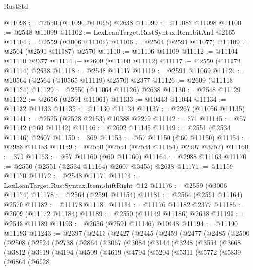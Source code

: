 \begin{lexlean}{RustStd}
\begin{coremodule}
@11098 := @2550 (@11090 @11095) @2638
@11099 := @11082 @11098
@11100 := @2548 @11099
@11102 := LexLeanTarget.RustSyntax.Item.bitAnd @2165
@11104 := @2559 (@3006 @11102)
@11106 := @2564 (@2591 @11077)
@11109 := @2564 (@2591 @11087) @2570
@11110 := @11106 @11109
@11112 := @11104 @11110 @2377
@11114 := @2609 (@11100 @11112)
@11117 := @2550 (@11072 @11114) @2638
@11118 := @2548 @11117
@11119 := @2591 @11069
@11124 := @10564 (@2564 (@10565 @11119) @2570) @2377
@11126 := @2609 (@11118 @11124)
@11129 := @2550 (@11064 @11126) @2638
@11130 := @2548 @11129
@11132 := @2656 (@2591 @11061)
@11133 := @10443 @11044
@11134 := @11132 @11133
@11135 := @11130 @11134
@11137 := @2267 (@11056 @11135)
@11141 := @2525 (@2528 @2153) @10388 @2279
@11142 := 371
@11145 := @57 @11142 (@60 @11142)
@11146 := @2602 @11145
@11149 := @2551 (@2534 @11146) @2607
@11150 := 369
@11153 := @57 @11150 (@60 @11150)
@11154 := @2988 @11153
@11159 := @2550 (@2551 (@2534 @11154) @2607 @3752)
@11160 := 370
@11163 := @57 @11160 (@60 @11160)
@11164 := @2988 @11163
@11170 := @2550 (@2551 (@2534 @11164) @2607 @3455) @2638
@11171 := @11159 @11170
@11172 := @2548 @11171
@11174 := LexLeanTarget.RustSyntax.Item.shiftRight @12
@11176 := @2559 (@3006 @11174)
@11178 := @2564 (@2591 @11154)
@11181 := @2564 (@2591 @11164) @2570
@11182 := @11178 @11181
@11184 := @11176 @11182 @2377
@11186 := @2609 (@11172 @11184)
@11189 := @2550 (@11149 @11186) @2638
@11190 := @2548 @11189
@11193 := @2656 (@2591 @11146) @10448
@11194 := @11190 @11193
@11243 := @2397
    (@2413
      (@2427
        (@2445
          (@2459
            (@2477
              (@2485
                (@2500
                  (@2508
                    (@2524
                      (@2738
                        (@2864
                          (@3067
                            (@3084
                              (@3144
                                (@3248
                                  (@3564
                                    (@3668
                                      (@3812
                                        (@3919
                                          (@4194
                                            (@4509
                                              (@4619
                                                (@4794
                                                  (@5204
                                                    (@5311
                                                      (@5772
                                                        (@5839
                                                          (@6864
                                                            (@6928

\end{coremodule}
\end{lexlean}
